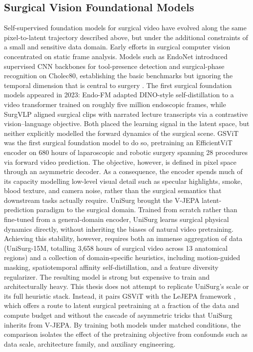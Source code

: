 \documentclass[11pt, a4paper]{article}
\begin{document}
\subsection{Surgical Vision Foundational Models}
Self-supervised foundation models for surgical video have evolved along the same pixel-to-latent trajectory described above, but under the additional constraints of a small and sensitive data domain. Early efforts in surgical computer vision concentrated on static frame analysis. Models such as EndoNet \parencite{endonet-2016} introduced supervised CNN backbones for tool-presence detection and surgical-phase recognition on Cholec80, establishing the basic benchmarks but ignoring the temporal dimension that is central to surgery \parencite{wu-2026}. The first surgical foundation models appeared in 2023: Endo-FM \parencite{wang-2023} adapted DINO-style self-distillation to a video transformer trained on roughly five million endoscopic frames, while SurgVLP \parencite{yuan-2023} aligned surgical clips with narrated lecture transcripts via a contrastive vision--language objective. Both placed the learning signal in the latent space, but neither explicitly modelled the forward dynamics of the surgical scene. GSViT \parencite{schmidgall2024general} was the first surgical foundation model to do so, pretraining an EfficientViT encoder on 680 hours of laparoscopic and robotic surgery spanning 28 procedures via forward video prediction. The objective, however, is defined in pixel space through an asymmetric decoder. As a consequence, the encoder spends much of its capacity modelling low-level visual detail such as specular highlights, smoke, blood texture, and camera noise, rather than the surgical semantics that downstream tasks actually require. UniSurg \parencite{wu-2026} brought the V-JEPA latent-prediction paradigm to the surgical domain. Trained from scratch rather than fine-tuned from a general-domain encoder, UniSurg learns surgical physical dynamics directly, without inheriting the biases of natural video pretraining. Achieving this stability, however, requires both an immense aggregation of data (UniSurg-15M, totalling 3{,}658 hours of surgical video across 13 anatomical regions) and a collection of domain-specific heuristics, including motion-guided masking, spatiotemporal affinity self-distillation, and a feature diversity regularizer. The resulting model is strong but expensive to train and architecturally heavy. This thesis does not attempt to replicate UniSurg's scale or its full heuristic stack. Instead, it pairs GSViT with the LeJEPA framework \parencite{balestriero-2025}, which offers a route to latent surgical pretraining at a fraction of the data and compute budget and without the cascade of asymmetric tricks that UniSurg inherits from V-JEPA. By training both models under matched conditions, the comparison isolates the effect of the pretraining objective from confounds such as data scale, architecture family, and auxiliary engineering.
\end{document}
